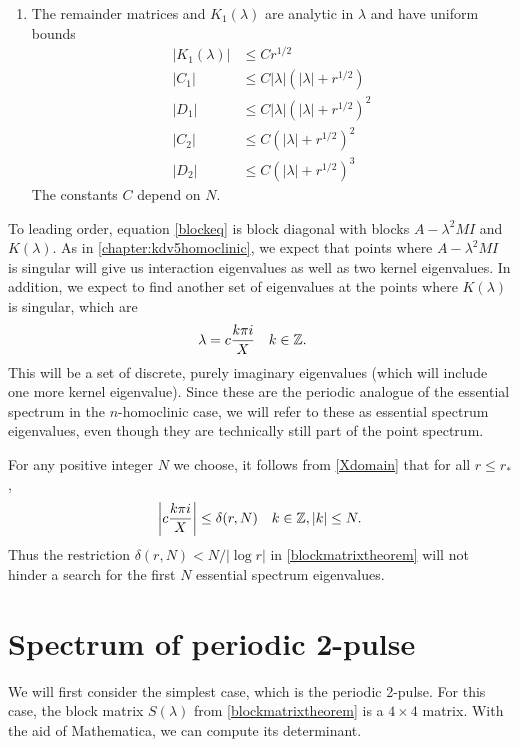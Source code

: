 \documentclass[thesis.tex]{subfiles}
\begin{document}
\begin{theorem}
\begin{enumerate}
\item The remainder matrices and $K_1(\lambda)$ are analytic in $\lambda$ and have uniform bounds
\begin{align*}
|K_1(\lambda)| &\leq C r^{1/2} \\
|C_1| &\leq C |\lambda|(|\lambda| + r^{1/2}) \\
|D_1| &\leq C |\lambda|(|\lambda| + r^{1/2})^2 \\
|C_2| &\leq C (|\lambda| + r^{1/2})^2 \\
|D_2| &\leq C (|\lambda| + r^{1/2})^3 
\end{align*}
The constants $C$ depend on $N$.
\end{enumerate}
\end{theorem}

To leading order, equation \cref{blockeq} is block diagonal with blocks $A - \lambda^2 MI$ and $K(\lambda)$. As in \cref{chapter:kdv5homoclinic}, we expect that points where $A - \lambda^2 MI$ is singular will give us interaction eigenvalues as well as two kernel eigenvalues. In addition, we expect to find another set of eigenvalues at the points where $K(\lambda)$ is singular, which are
\begin{align*}
\lambda &= c\frac{k \pi i}{X} && k \in \mathbb{Z}.
\end{align*}
This will be a set of discrete, purely imaginary eigenvalues (which will include one more kernel eigenvalue). Since these are the periodic analogue of the essential spectrum in the $n$-homoclinic case, we will refer to these as essential spectrum eigenvalues, even though they are technically still part of the point spectrum. 

\begin{remark}
For any positive integer $N$ we choose, it follows from \cref{Xdomain} that for all $r \leq r_*$,
\begin{align*}
\left| c\frac{k \pi i}{X} \right| \leq \delta(r,N) && k \in \mathbb{Z}, |k|\leq N.
\end{align*}
Thus the restriction $\delta(r,N) < N/|\log r|$ in \cref{blockmatrixtheorem} will not hinder a search for the first $N$ essential spectrum eigenvalues.
\end{remark}

\section{Spectrum of periodic 2-pulse}\label{sec:per2peig}

We will first consider the simplest case, which is the periodic 2-pulse. For this case, the block matrix  $S(\lambda)$ from \cref{blockmatrixtheorem} is a $4\times4$ matrix. With the aid of Mathematica, we can compute its determinant.
\end{document}
